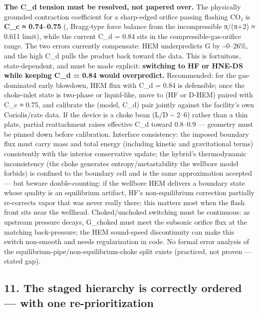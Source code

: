 \textbf{The C\_d tension must be resolved, not papered over.} The
physically grounded contraction coefficient for a sharp-edged orifice
passing flashing CO₂ is \textbf{C\_c ≈ 0.74--0.75} (\citealp{hammer2022}, Bragg-type force balance from the incompressible π/(π+2) ≈ 0.611 limit),
while the current C\_d = 0.84 sits in the compressible-gas-orifice
range. The two errors currently compensate: HEM underpredicts G by
\textasciitilde0--26\%, and the high C\_d pulls the product back toward
the data. This is fortuitous, state-dependent, and must be made
explicit: \textbf{switching to HF or HNE-DS while keeping C\_d = 0.84
would overpredict.} Recommended: for the gas-dominated early blowdown,
HEM flux with C\_d = 0.84 is defensible; once the choke-inlet state is
two-phase or liquid-like, move to (HF or D-HEM) paired with C\_c ≈ 0.75,
and calibrate the (model, C\_d) pair jointly against the facility's own
Coriolis/rate data. If the device is a choke bean (L/D \textasciitilde{}
2--6) rather than a thin plate, partial reattachment raises effective
C\_d toward 0.8--0.9 --- geometry must be pinned down before
calibration. Interface consistency: the imposed boundary flux must carry
mass and total energy (including kinetic and gravitational terms)
consistently with the interior conservative update; the hybrid's
thermodynamic inconsistency (the choke generates entropy/metastability
the wellbore model forbids) is confined to the boundary cell and is the same approximation \citet{hammer2022} accepted --- but beware
double-counting: if the wellbore HEM delivers a boundary state whose
quality is an equilibrium artifact, HF's non-equilibrium correction
partially re-corrects vapor that was never really there; this matters
most when the flash front sits near the wellhead. Choked/unchoked
switching must be continuous: as upstream pressure decays, G\_choked
must meet the subsonic orifice flux at the matching back-pressure; the
HEM sound-speed discontinuity can make this switch non-smooth and needs
regularization in code. No formal error analysis of the
equilibrium-pipe/non-equilibrium-choke split exists (practiced, not
proven --- stated gap).

\hypertarget{the-staged-hierarchy-is-correctly-ordered-with-one-re-prioritization}{%
\subsection{11. The staged hierarchy is correctly ordered --- with one
re-prioritization}\label{the-staged-hierarchy-is-correctly-ordered-with-one-re-prioritization}}


